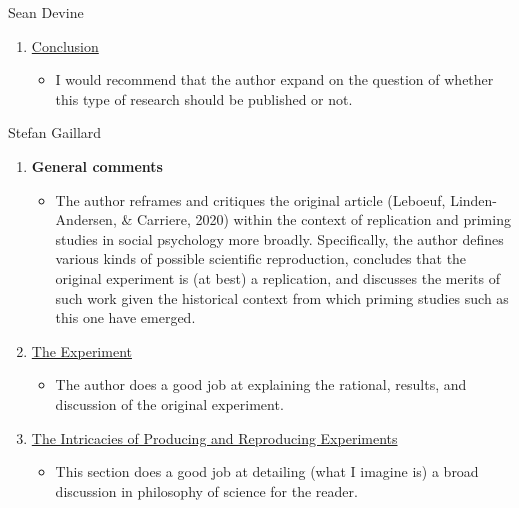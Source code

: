 \documentclass[twocolumn, serif, review, authordate]{jote-article}
\begin{document}
\begin{paracol}{2}
\begin{reviewend}{Sean Devine}
\begin{enumerate}[label=\textbf{\arabic*}), start=0]
    \item \hyperref[sec:conclusion]{Conclusion}
        \begin{itemize}
            \item I would recommend that the author expand on the question of whether this type of research should be published or not. 
        \end{itemize}
        
    \end{enumerate}
\end{reviewend}
\end{paracol}

\begin{paracol}{2}
\begin{reviewend}{Stefan Gaillard}
    \begin{enumerate}[label=\textbf{\arabic*}), start=0]
    \item \textbf{General comments}
        \begin{itemize}
            \item The author reframes and critiques the original article (Leboeuf, Linden-Andersen, \& Carriere, 2020) within the context of replication and priming studies in social psychology more broadly. Specifically, the author defines various kinds of possible scientific reproduction, concludes that the original experiment is (at best) a replication, and discusses the merits of such work given the historical context from which priming studies such as this one have emerged.
        \end{itemize}

    \item \hyperref[sec:experiment]{The Experiment}
        \begin{itemize}
            \item The author does a good job at explaining the rational, results, and discussion of the original experiment. 
        \end{itemize}

    \item \hyperref[sec:intricacies]{The Intricacies of Producing and Reproducing Experiments}
        \begin{itemize}
            \item This section does a good job at detailing (what I imagine is) a broad discussion in philosophy of science for the reader.
        \end{itemize}


\end{enumerate}
\end{reviewend}
\end{paracol}
\end{document}

